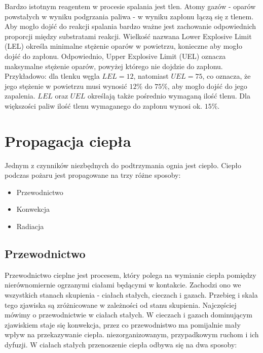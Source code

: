 Bardzo istotnym reagentem w procesie spalania jest tlen. Atomy gazów - oparów powstałych w wyniku podgrzania paliwa - w wyniku zapłonu łączą się z tlenem.
Aby mogło dojść do reakcji spalania bardzo ważne jest zachowanie odpowiednich proporcji między substratami reakcji. Wielkość nazwana Lower Explosive Limit (LEL) określa 
minimalne stężenie oparów w powietrzu, konieczne aby mogło dojść do zapłonu. Odpowiednio, Upper Explosive Limit (UEL) oznacza maksymalne stężenie oparów, powyżej
którego nie dojdzie do zapłonu. Przykładowo: dla tlenku węgla $LEL=12$, natomiast $UEL=75$, co oznacza, że jego stężenie w powietrzu musi wynosić  $12\%$ do $75\%$, aby mogło dojść
do jego zapalenia. $LEL$ oraz $UEL$ określają także pośrednio wymaganą ilość tlenu. Dla większości paliw ilość tlenu wymaganego do zapłonu wynosi ok. $15\%$. 

\section {Propagacja ciepła}
Jednym z czynników niezbędnych
do podtrzymania ognia jest ciepło. Ciepło podczas pożaru jest propagowane na trzy różne sposoby:
\begin {itemize}
\item Przewodnictwo
\item Konwekcja
\item Radiacja
\end {itemize}

\subsection {Przewodnictwo}
\label{Przewodnictwo}
 Przewodnictwo cieplne jest procesem, który polega na wymianie ciepła 
pomiędzy nierównomiernie ogrzanymi ciałami będącymi w kontakcie. Zachodzi ono we wszystkich stanach skupienia - ciałach stałych, cieczach i gazach. Przebieg i skala tego zjawiska są zróżnicowane w zależności od stanu skupienia. Najczęściej mówimy o przewodnictwie w ciałach stałych.
W cieczach i gazach dominującym zjawiskiem staje się konwekcja, przez co przewodnistwo ma pomijalnie mały wpływ na przekazywanie ciepła.
niezorganizowanym, przypadkowym ruchom i ich dyfuzji.
W ciałach stałych przenoszenie ciepła odbywa się  na dwa sposoby:

